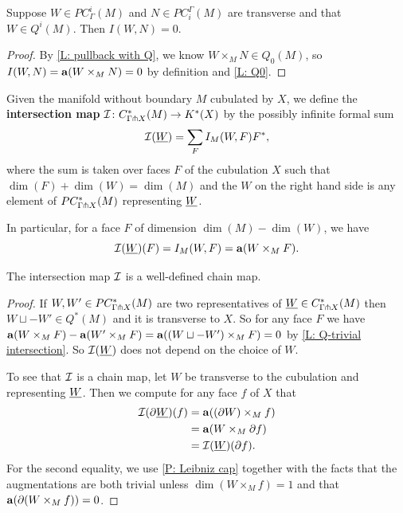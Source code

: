 \begin{lemma}\label{L: Q-trivial intersection}
	Suppose $W \in PC_\Gamma^i(M)$ and $N \in PC_{i}^\Gamma(M)$ are transverse and that $W \in Q^i(M)$.
	Then $I(W,N) = 0$.
\end{lemma}

\begin{proof}
	By \cref{L: pullback with Q}, we know $W \times_M N \in Q_0(M)$, so $I(W,N) = \mathbf{a}(W \times_M N) = 0$ by definition and \cref{L: Q0}.
\end{proof}


\begin{definition}\label{D: intersection homomorphism}
	Given the manifold without boundary $M$ cubulated by $X$, we define the \textbf{intersection map} $\mathcal{I} \colon C^*_{\Gamma \pitchfork X}(M) \to K^*(X)$ by the possibly infinite formal sum $$\mathcal{I}(\underline{W}) = \sum_F I_M(W,F)F^*,$$ where the sum is taken over faces $F$ of the cubulation $X$ such that $\dim(F)+\dim(W) = \dim(M)$ and the $W$ on the right hand side is any element of $PC^*_{\Gamma \pitchfork X}(M)$ representing $\underline{W}$.

	In particular, for a face $F$ of dimension $\dim(M)-\dim(W)$, we have $$\mathcal{I}(\underline{W})(F) = I_M(W,F) = \mathbf{a}(W \times_M F).$$
\end{definition}

\begin{proposition}\label{P: I is well defined}
	The intersection map $\mathcal{I}$ is a well-defined chain map.
\end{proposition}

\begin{proof}
	If $W, W' \in PC^*_{\Gamma \pitchfork X}(M)$ are two representatives of $\underline{W} \in C^*_{\Gamma \pitchfork X}(M)$ then $W \sqcup -W' \in Q^*(M)$ and it is transverse to $X$.
	So for any face $F$ we have $\mathbf{a}(W \times_M F)-\mathbf{a}(W' \times_M F) = \mathbf{a}((W \sqcup -W') \times_M F) = 0$ by \cref{L: Q-trivial intersection}.
	So $\mathcal{I}(\underline{W})$ does not depend on the choice of $W$.

	To see that $\mathcal{I}$ is a chain map, let $W$ be transverse to the cubulation and representing $\underline{W}$.
	Then we compute for any face $f$ of $X$ that
	\begin{align*}
		\mathcal{I}(\partial\underline{W})(f)& = \mathbf{a}((\partial W) \times_M f)\\
		& = \mathbf{a}(W \times_M \partial f)\\
		& = \mathcal{I}(\underline{W})(\partial f).
	\end{align*}
	For the second equality, we use \cref{P: Leibniz cap} together with the facts that the augmentations are both trivial unless $\dim(W \times_M f) = 1$ and that $\mathbf{a}(\partial (W \times_M f)) = 0$.
\end{proof}

